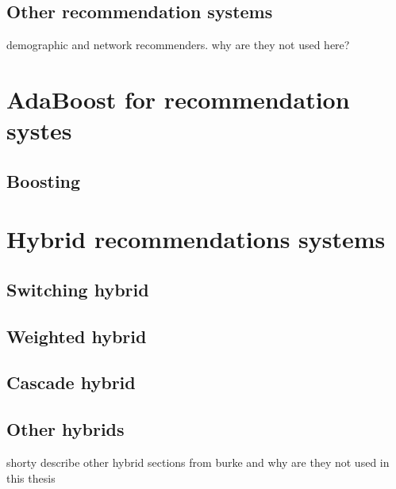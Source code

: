 \documentclass[10pt]{reportMaster}
\begin{document}
\section{Other recommendation systems}
\label{rs_others}
demographic and network recommenders.
why are they not used here?









\chapter{AdaBoost for recommendation systes}
\section{Boosting}











\chapter{Hybrid recommendations systems}

\section{Switching hybrid}

\section{Weighted hybrid}

\section{Cascade hybrid}

\section{Other hybrids}
shorty describe other hybrid sections from burke and why are they not used in this thesis
\end{document}
